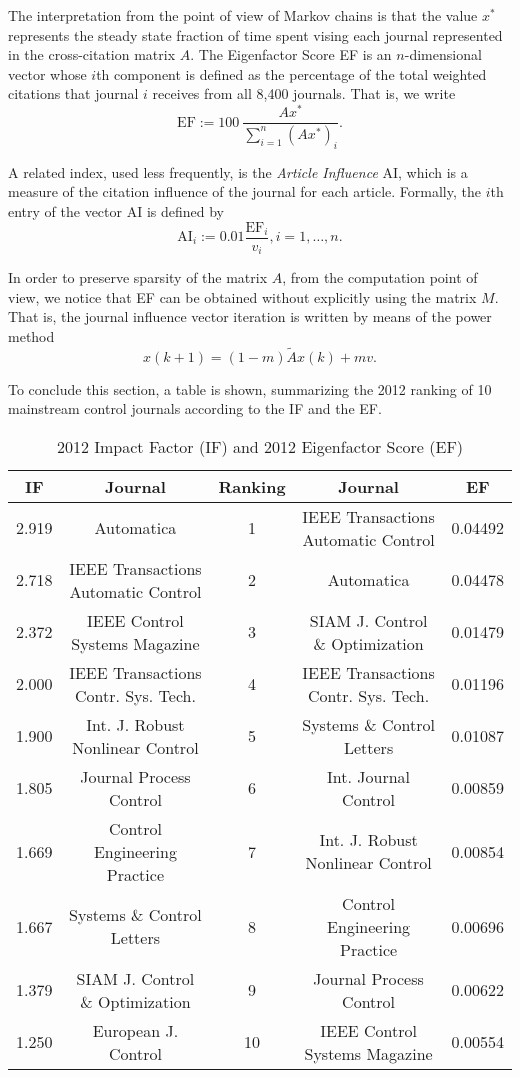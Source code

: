 \documentclass[11pt,draftcls,onecolumn]{IEEEtran}
\begin{document}
The interpretation from the point of view of Markov chains is that the value
$x^*$ represents the steady state fraction of time spent vising each journal 
represented in the cross-citation matrix $A$. The Eigenfactor Score EF is an $n$-dimensional vector whose $i$th 
component is defined as the percentage of the total weighted citations that journal $i$ receives 
from all 8,400 journals. That is, we write
$$
\mbox{EF} := 100 \ \frac{A x^*}{\sum_{i=1}^n (A x^*)_i}.
$$

A related index, used less frequently, is the {\it Article Influence} AI, 
which is a measure of the citation influence 
of the journal for each article. Formally, 
the $i$th entry of the vector AI is defined by
$$
\mbox{AI}_i := 0.01 \frac{\mbox{EF}_i}{v_i}, i=1,\ldots,n.
$$

In order to preserve sparsity of the matrix $A$, from the computation point of view, we notice that 
EF can be obtained without explicitly using the matrix $M$. 
That is, the journal influence 
vector iteration is written by means of the power method 
\begin{equation*}
x(k+1) = (1-m) \tilde A x(k) + m v.
\end{equation*}

To conclude this section, a table is shown, summarizing 
the 2012 ranking of 10 mainstream control journals according to the IF and the EF.


\begin{table}[htb]
\caption{2012 Impact Factor (IF) and 2012 Eigenfactor Score (EF)}
\label{IFandEI}
\begin{tabular}{|c|c|c|c|c|} \hline
IF & Journal & Ranking & Journal & EF\\ \hline
2.919 & Automatica & 1 & IEEE Transactions Automatic Control & 0.04492\\
2.718 &IEEE Transactions Automatic Control & 2 & Automatica & 0.04478\\
2.372 &IEEE Control Systems Magazine & 3 & SIAM J. Control \& Optimization &0.01479\\
2.000 &IEEE Transactions Contr. Sys. Tech. & 4 & IEEE Transactions Contr. Sys. Tech. & 0.01196\\
1.900 &Int. J. Robust 
Nonlinear Control & 5 & Systems \& Control Letters &0.01087\\
1.805 &Journal Process Control & 6 & Int. Journal Control &0.00859\\
1.669 & Control Engineering Practice & 7 & Int. J. Robust Nonlinear Control&0.00854\\
1.667 &Systems \& Control Letters & 8 & Control Engineering Practice & 0.00696\\
1.379&SIAM J. Control \& Optimization & 9 & Journal Process Control&0.00622\\
1.250&European J. Control & 10 & IEEE Control Systems Magazine& 0.00554\\
\hline
\end{tabular}
\end{table}
\end{document}
